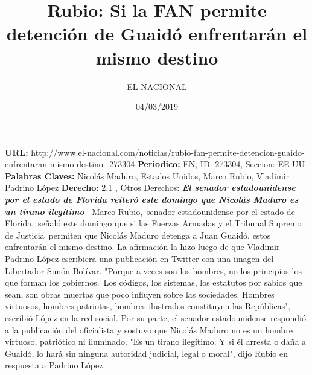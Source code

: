 \documentclass{article}%
\title{\textbf{Rubio: Si la FAN permite detención de Guaidó enfrentarán el mismo destino}}%
\author{EL NACIONAL}%
\date{04/03/2019}%
\begin{document}
%
\normalsize%
\maketitle%
\textbf{URL: }%
http://www.el{-}nacional.com/noticias/rubio{-}fan{-}permite{-}detencion{-}guaido{-}enfrentaran{-}mismo{-}destino\_273304\newline%
%
\textbf{Periodico: }%
EN, %
ID: %
273304, %
Seccion: %
EE UU\newline%
%
\textbf{Palabras Claves: }%
Nicolás Maduro, Estados Unidos, Marco Rubio, Vladimir Padrino López\newline%
%
\textbf{Derecho: }%
2.1%
, Otros Derechos: %
\newline%
%
\textbf{\textit{El senador estadounidense por el estado de Florida reiteró este domingo que Nicolás Maduro es un tirano ilegítimo~}}%
\newline%
\newline%
%
Marco Rubio,~senador estadounidense por el estado de Florida,~señaló este domingo que si las Fuerzas Armadas y el Tribunal Supremo de Justicia~permiten que Nicolás Maduro detenga a Juan Guaidó, estos enfrentarán el mismo destino.%
\newline%
%
La afirmación la hizo luego de que Vladimir Padrino López escribiera una publicación en Twitter con una imagen del Libertador Simón Bolívar.%
\newline%
%
"Porque a veces son los hombres, no los principios los que forman los gobiernos.~Los códigos, los sistemas, los estatutos por sabios que sean, son obras muertas que poco influyen sobre las sociedades. Hombres virtuosos, hombres patriotas, hombres ilustrados constituyen las Repúblicas", escribió López en la red social.%
\newline%
%
Por su parte, el senador estadounidense respondió a la publicación del oficialista y sostuvo que Nicolás Maduro no es un hombre virtuoso, patriótico ni iluminado.%
\newline%
%
"Es un tirano ilegítimo. Y si él arresta o daña a Guaidó, lo hará sin ninguna autoridad judicial, legal o moral", dijo Rubio en respuesta a Padrino López.%
\newline%
%
\end{document}
